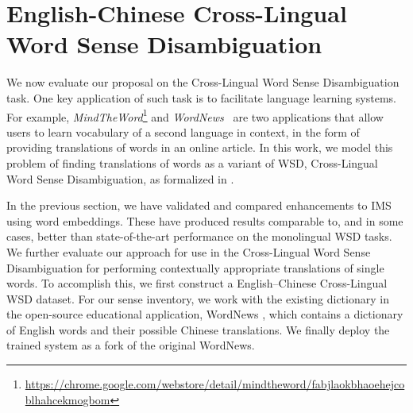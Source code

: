 \section{English-Chinese Cross-Lingual Word Sense Disambiguation}
\label{section:CLWSD}





We now evaluate our proposal on the Cross-Lingual Word Sense
Disambiguation task.  One key application of such task is to
facilitate language learning systems.  For example, {\it
  MindTheWord}\footnote{\url{https://chrome.google.com/webstore/detail/mindtheword/fabjlaokbhaoehejcoblhahcekmogbom}}
and {\it WordNews}~\cite{tao2014} are two applications that allow
users to learn vocabulary of a second language in context, in the form
of providing translations of words in an online article.
In this work, we model this problem of finding translations of words
as a variant of WSD, Cross-Lingual Word Sense Disambiguation, as
formalized in \cite{tao2014}.

In the previous section, we have validated and compared enhancements to
IMS using word embeddings. These have produced results comparable to,
and in some cases, better than state-of-the-art performance on the
monolingual WSD tasks. We further evaluate our approach for use in the
Cross-Lingual Word Sense Disambiguation for performing contextually
appropriate translations of single words. To accomplish this, we first
construct a English--Chinese Cross-Lingual WSD dataset. For our sense
inventory, we work with the existing dictionary in the open-source
educational application, WordNews \cite{tao2014}, which contains a
dictionary of English words and their possible Chinese
translations. We finally deploy the trained system as a fork of the
original WordNews.

